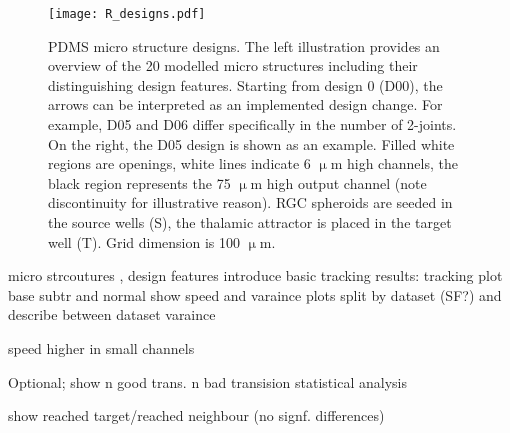 \begin{figure}
    \texttt{[image: R\_designs.pdf]}
    \caption[PDMS micro structure designs]
        {PDMS micro structure designs. The left illustration provides an
        overview of the 20 modelled micro structures including their
        distinguishing design features. Starting from design 0 (D00), the arrows
        can be interpreted as an implemented design change. For example, D05 and
        D06 differ specifically in the number of 2-joints. On the right, the D05
        design is shown as an example. Filled white regions are openings, white
        lines indicate 6 $\upmu$m high channels, the black region represents the
        75 $\upmu$m high output channel (note discontinuity for illustrative
        reason). RGC spheroids are seeded in the source wells (S), the thalamic
        attractor is placed in the target well (T). Grid dimension is 100
        $\upmu$m.} 
    \label{R_designs}
\end{figure}





micro strcoutures , design features 
introduce basic tracking results: tracking plot base subtr and normal
show speed and varaince plots split by dataset (SF?) and describe between 
dataset varaince

speed higher in small channels

Optional;
    show n good trans. n bad transision statistical analysis

show reached target/reached neighbour (no signf. differences)


